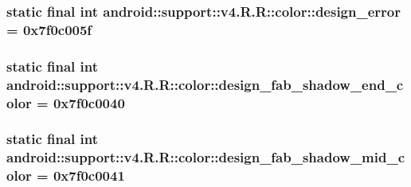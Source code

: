 \hypertarget{classandroid_1_1support_1_1v4_1_1_r_1_1color_33b96c004cc2e17fbb3c403c8e2dd857}{
\subsubsection[{design\_\-error}]{\setlength{\rightskip}{0pt plus 5cm}static final int android::support::v4.R.R::color::design\_\-error = 0x7f0c005f}}
\label{classandroid_1_1support_1_1v4_1_1_r_1_1color_33b96c004cc2e17fbb3c403c8e2dd857}


\hypertarget{classandroid_1_1support_1_1v4_1_1_r_1_1color_d27e1abc977d9cee7a5fbd9631269e0f}{
\subsubsection[{design\_\-fab\_\-shadow\_\-end\_\-color}]{\setlength{\rightskip}{0pt plus 5cm}static final int android::support::v4.R.R::color::design\_\-fab\_\-shadow\_\-end\_\-color = 0x7f0c0040}}
\label{classandroid_1_1support_1_1v4_1_1_r_1_1color_d27e1abc977d9cee7a5fbd9631269e0f}


\hypertarget{classandroid_1_1support_1_1v4_1_1_r_1_1color_77d81560485007b29bdb075fca2be45e}{
\subsubsection[{design\_\-fab\_\-shadow\_\-mid\_\-color}]{\setlength{\rightskip}{0pt plus 5cm}static final int android::support::v4.R.R::color::design\_\-fab\_\-shadow\_\-mid\_\-color = 0x7f0c0041}}
\label{classandroid_1_1support_1_1v4_1_1_r_1_1color_77d81560485007b29bdb075fca2be45e}


